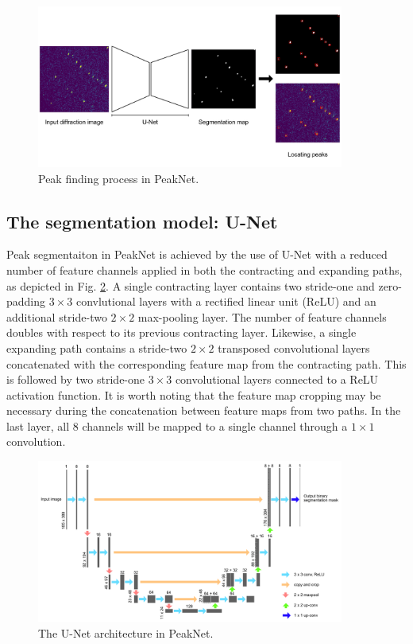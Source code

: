 \documentclass[conference]{IEEEtran}
\newcommand{\peaknet}{PeakNet}
\begin{document}
\begin{figure}[htbp]
\centering
\includegraphics[width=0.9\textwidth,keepaspectratio]
{./figures/peaknet.method.pdf}
\caption{Peak finding process in \peaknet{}.}
\label{fig : peak finding}
\end{figure}


\subsection{The segmentation model: U-Net}

Peak segmentaiton in \peaknet{} is achieved by the use of U-Net
\citep{ronnebergerUNetConvolutionalNetworks2015} with a reduced number of
feature channels applied in both the contracting and expanding paths, as
depicted in Fig. \ref{fig : unet}.  A single contracting layer contains two
stride-one and zero-padding $3 \times 3$ convlutional layers with a rectified
linear unit (ReLU) \citep{fukushimaCognitronSelforganizingMultilayered1975} and
an additional stride-two $2 \times 2$ max-pooling layer.  The number of feature
channels doubles with respect to its previous contracting layer.  Likewise, a
single expanding path contains a stride-two $2 \times 2$ transposed
convolutional layers concatenated with the corresponding feature map from the
contracting path.  This is followed by two stride-one $3 \times 3$ convolutional
layers connected to a ReLU activation function.  It is worth noting that the
feature map cropping may be necessary during the concatenation between feature
maps from two paths.  In the last layer, all 8 channels will be mapped to a
single channel through a $1 \times 1$ convolution.

\begin{figure}[htbp]    %
\centering
\includegraphics[width=0.9\textwidth,keepaspectratio]
{./figures/unet.pdf}
\caption{The U-Net architecture in \peaknet{}.}
\label{fig : unet}
\end{figure}
\end{document}
